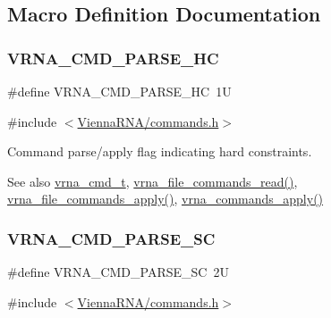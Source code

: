 \subsection{Macro Definition Documentation}
\mbox{\label{group__command__files_gac54dec838d7b6bebd5df85f71702d324}} 
\subsubsection{\texorpdfstring{VRNA\_CMD\_PARSE\_HC}{VRNA\_CMD\_PARSE\_HC}}
{\footnotesize\ttfamily \#define V\+R\+N\+A\+\_\+\+C\+M\+D\+\_\+\+P\+A\+R\+S\+E\+\_\+\+HC~1U}



{\ttfamily \#include $<$\mbox{\hyperlink{commands_8h}{Vienna\+R\+N\+A/commands.\+h}}$>$}



Command parse/apply flag indicating hard constraints. 

\begin{DoxySeeAlso}{See also}
\mbox{\hyperlink{group__command__files_gaf31afe4c5f8e4bf44a670ab4c3dcd916}{vrna\+\_\+cmd\+\_\+t}}, \mbox{\hyperlink{group__command__files_gae5f56400ed43683338f7bf1c1102655a}{vrna\+\_\+file\+\_\+commands\+\_\+read()}}, \mbox{\hyperlink{group__command__files_gadbe8c9622f7bcc6dcbe3448b98df8656}{vrna\+\_\+file\+\_\+commands\+\_\+apply()}}, \mbox{\hyperlink{group__command__files_gac65d0fe86f7671a2d2b85dda1a3ddc16}{vrna\+\_\+commands\+\_\+apply()}} 
\end{DoxySeeAlso}
\mbox{\label{group__command__files_ga8cad3c1f83e6f149829c49a186a83e21}} 
\subsubsection{\texorpdfstring{VRNA\_CMD\_PARSE\_SC}{VRNA\_CMD\_PARSE\_SC}}
{\footnotesize\ttfamily \#define V\+R\+N\+A\+\_\+\+C\+M\+D\+\_\+\+P\+A\+R\+S\+E\+\_\+\+SC~2U}



{\ttfamily \#include $<$\mbox{\hyperlink{commands_8h}{Vienna\+R\+N\+A/commands.\+h}}$>$}



